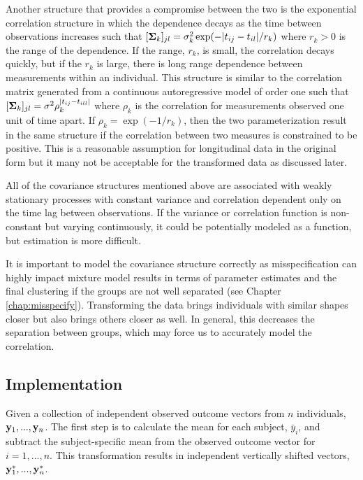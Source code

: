Another structure that provides a compromise between the two is the exponential correlation structure in which the dependence decays as the time between observations increases such that $[\mathbf \Sigma_{k}]_{jl} = \sigma_{k}^{2}\exp(-| t_{ij}-t_{il}| / r_{k})$ where $r_{k}> 0$ is the range of the dependence. If the range, $r_{k}$, is small, the correlation decays quickly, but if the $r_{k}$ is large, there is long range dependence between measurements within an individual. This structure is similar to the correlation matrix generated from a continuous autoregressive model of order one such that $[\mathbf\Sigma_{k}]_{jl} = \sigma^{2}\rho_{k}^{|t_{ij}-t_{ill}|}$ where $\rho_{k}$ is the correlation for measurements observed one unit of time apart. If $\rho_{k} = \exp(-1/r_{k})$, then the two parameterization result in the same structure if the correlation between two measures is constrained to be positive. This is a reasonable assumption for longitudinal data in the original form but it many not be acceptable for the transformed data as discussed later.

All of the covariance structures mentioned above are associated with weakly stationary processes with constant variance and correlation dependent only on the time lag between observations. If the variance or correlation function is non-constant but varying continuously, it could be potentially modeled as a function, but estimation is more difficult.

It is important to model the covariance structure correctly as misspecification can highly impact mixture model results in terms of parameter estimates and the final clustering if the groups are not well separated (see Chapter \ref{chap:misspecify}). Transforming the data brings individuals with similar shapes closer but also brings others closer as well. In general, this decreases the separation between groups, which may force us to accurately model the correlation. 

\subsection{Implementation}
Given a collection of independent observed outcome vectors from $n$ individuals, $\mathbf y_{1},...,\mathbf y_{n}$. The first step is to calculate the mean for each subject, $\bar{y}_{i}$,  and subtract the subject-specific mean from the observed outcome vector for $i=1,...,n$. This transformation results in independent vertically shifted vectors, $\mathbf y^{*}_{1},...,\mathbf y^{*}_{n}$.  

